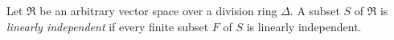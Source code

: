 Let $\Re$ be an arbitrary vector space over a division ring $\Delta$. A subset $S$ of $\Re$ is \textit{linearly independent} if every finite subset $F$ of $S$ is linearly independent.
